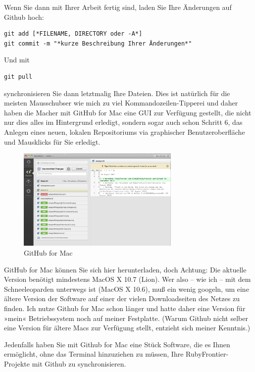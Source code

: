 \documentclass[11pt]{report}
\begin{document}
Wenn Sie dann mit Ihrer Arbeit fertig sind, laden Sie Ihre Änderungen
auf Github hoch:


\begin{verbatim}
git add [*FILENAME, DIRECTORY oder -A*]
git commit -m "*kurze Beschreibung Ihrer Änderungen*"
\end{verbatim}

Und mit


\begin{verbatim}
git pull
\end{verbatim}

synchronisieren Sie dann letztmalig Ihre Dateien. Dies ist natürlich
für die meisten Mausschubser wie mich zu viel Kommandozeilen-Tipperei
und daher haben die Macher mit GitHub for Mac eine GUI zur Verfügung
gestellt, die nicht nur dies alles im Hintergrund erledigt, sondern
sogar auch schon Schritt 6, das Anlegen eines neuen, lokalen
Repositoriums via graphischer Benutzeroberfläche und Mausklicks für
Sie erledigt.

\begin{figure}[h!]
\centering
\includegraphics[width=0.7\textwidth]{./images/github-for-mac-working.png}
\caption{\label{github-for-mac-working}GitHub for Mac}
\end{figure}

GitHub for Mac können Sie sich hier herunterladen, doch Achtung: Die
aktuelle Version benötigt mindestens MacOS X 10.7 (Lion). Wer also –
wie ich – mit dem Schneeleoparden unterwegs ist (MacOS X 10.6), muß
ein wenig googeln, um eine ältere Version der Software auf einer der
vielen Downloadseiten des Netzes zu finden. Ich nutze Github for Mac
schon länger und hatte daher eine Version für »mein« Betriebssystem
noch auf meiner Festplatte. (Warum Github nicht selber eine Version
für ältere Macs zur Verfügung stellt, entzieht sich meiner Kenntnis.)


Jedenfalls haben Sie mit Github for Mac eine Stück Software, die es
Ihnen ermöglicht, ohne das Terminal hinzuziehen zu müssen, Ihre
RubyFrontier-Projekte mit Github zu synchronisieren.
\end{document}
